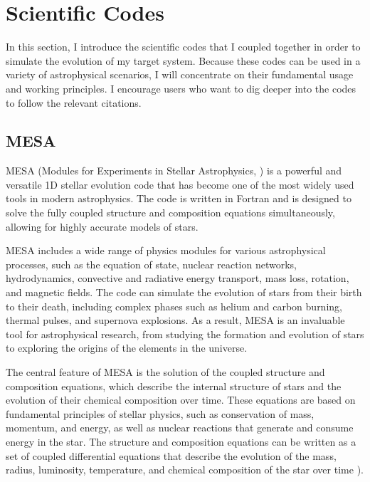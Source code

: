 \section{Scientific Codes}\label{sec:scientific_codes}

In this section, I introduce the scientific codes that I coupled together in order to simulate the evolution of my target system.  Because these codes can be used in a variety of astrophysical scenarios, I will concentrate on their fundamental usage and working principles. I encourage users who want to dig deeper into the codes to follow the relevant citations. 

\subsection{MESA}

MESA (Modules for Experiments in Stellar Astrophysics, \cite{paxton2010modules,paxton2013modules,paxton2015modules,paxton2019modules}) is a powerful and versatile 1D stellar evolution code that has become one of the most widely used tools in modern astrophysics. The code is written in Fortran and is designed to solve the fully coupled structure and composition equations simultaneously, allowing for highly accurate models of stars.

MESA includes a wide range of physics modules for various astrophysical processes, such as the equation of state, nuclear reaction networks, hydrodynamics, convective and radiative energy transport, mass loss, rotation, and magnetic fields. The code can simulate the evolution of stars from their birth to their death, including complex phases such as helium and carbon burning, thermal pulses, and supernova explosions. As a result, MESA is an invaluable tool for astrophysical research, from studying the formation and evolution of stars to exploring the origins of the elements in the universe.

The central feature of MESA is the solution of the coupled structure and composition equations, which describe the internal structure of stars and the evolution of their chemical composition over time. These equations are based on fundamental principles of stellar physics, such as conservation of mass, momentum, and energy, as well as nuclear reactions that generate and consume energy in the star. The structure and composition equations can be written as a set of coupled differential equations that describe the evolution of the mass, radius, luminosity, temperature, and chemical composition of the star over time \citep{paxton2010modules,paxton2013modules,paxton2015modules,paxton2019modules}).

